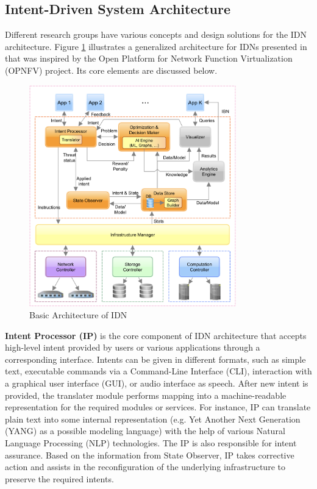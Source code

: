 \subsection{Intent-Driven System Architecture}

Different research groups have various concepts and design solutions for the IDN architecture. Figure \ref{fig:IDN_Architecture} illustrates a generalized architecture for IDNs presented in \cite[3]{Saha2018} that was inspired by the Open Platform for Network Function Virtualization (OPNFV) project. Its core elements are discussed below.  

\begin{figure}[htb]
  \centering
  \includegraphics[width=0.8\textwidth]{figures/IBN_Architecture.png}
  \caption{Basic Architecture of IDN\cite{Saha2018}}
  \label{fig:IDN_Architecture}
\end{figure}

\textbf{Intent Processor (IP)} is the core component of IDN architecture that accepts high-level intent provided by users or various applications through a corresponding interface. Intents can be given in different formats, such as simple text, executable commands via a Command-Line Interface (CLI), interaction with a graphical user interface (GUI), or audio interface as speech. After new intent is provided, the translater module performs mapping into a machine-readable representation for the required modules or services. For instance, IP can translate plain text into some internal representation (e.g. Yet Another Next Generation (YANG) as a possible modeling language) with the help of various Natural Language Processing (NLP) technologies\cite[15]{Mehmood2021}. The IP is also responsible for intent assurance. Based on the information from State Observer, IP takes corrective action and assists in the reconfiguration of the underlying infrastructure to preserve the required intents.

